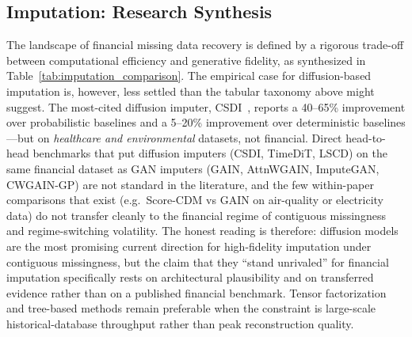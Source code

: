 \subsection{Imputation: Research Synthesis}

The landscape of financial missing data recovery is defined by a rigorous trade-off between computational efficiency and generative fidelity, as synthesized in Table~\ref{tab:imputation_comparison}. The empirical case for diffusion-based imputation is, however, less settled than the tabular taxonomy above might suggest. The most-cited diffusion imputer, CSDI~\citep{tashiro2021csdi}, reports a 40--65\% improvement over probabilistic baselines and a 5--20\% improvement over deterministic baselines---but on \emph{healthcare and environmental} datasets, not financial. Direct head-to-head benchmarks that put diffusion imputers (CSDI, TimeDiT, LSCD) on the same financial dataset as GAN imputers (GAIN, AttnWGAIN, ImputeGAN, CWGAIN-GP) are not standard in the literature, and the few within-paper comparisons that exist (e.g.\ Score-CDM vs GAIN on air-quality or electricity data) do not transfer cleanly to the financial regime of contiguous missingness and regime-switching volatility. The honest reading is therefore: diffusion models are the most promising current direction for high-fidelity imputation under contiguous missingness, but the claim that they ``stand unrivaled'' for financial imputation specifically rests on architectural plausibility and on transferred evidence rather than on a published financial benchmark. Tensor factorization and tree-based methods remain preferable when the constraint is large-scale historical-database throughput rather than peak reconstruction quality.

